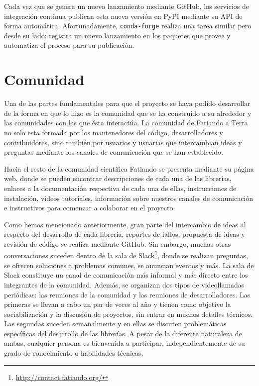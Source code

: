 Cada vez que se genera un nuevo lanzamiento mediante GitHub,
los servicios de integración continua publican esta nueva versión en PyPI
mediante su \ac{API} de forma automática.
Afortunadamente, \texttt{conda-forge} realiza una tarea similar pero desde su
lado: registra un nuevo lanzamiento en los paquetes que provee y automatiza el
proceso para su publicación.


\section{Comunidad}

Una de las partes fundamentales para que el proyecto se haya podido desarrollar
de la forma en que lo hizo es la comunidad que se ha construido a su alrededor
y las comunidades con las que ésta interactúa.
La comunidad de Fatiando a Terra no solo esta formada por los mantenedores del
código, desarrolladores y contribuidores, sino también por usuarios
y usuarias que intercambian ideas y preguntas mediante los canales de
comunicación que se han establecido.

Hacia el resto de la comunidad científica Fatiando se presenta mediante su
página web, donde se pueden encontrar descripciones de cada una de las
librerías, enlaces a la documentación respectiva de cada una de ellas,
instrucciones de instalación, videos tutoriales, información sobre nuestros
canales de comunicación e instructivos para comenzar a colaborar en el
proyecto.

Como hemos mencionado anteriormente, gran parte del intercambio de ideas al
respecto del desarrollo de cada librería, reportes de fallos, propuesta de
ideas y revisión de código se realiza mediante GitHub.
Sin embargo, muchas otras conversaciones suceden dentro de la sala de
Slack\footnote{\url{http://contact.fatiando.org/}}, donde se realizan
preguntas, se ofrecen soluciones a problemas comunes, se anuncian eventos
y más.
La sala de Slack constituye un canal de comunicación más informal y más
directo entre los integrantes de la comunidad.
Además, se organizan dos tipos de videollamadas periódicas: las reuniones de la
comunidad y las reuniones de desarrolladores.
Las primeras se llevan a cabo un par de veces al año y tienen como objetivo la
sociabilización y la discusión de proyectos, sin entrar en muchos detalles
técnicos.
Las segundas suceden semanalmente y en ellas se discuten problemáticas
específicas del desarrollo de las librerías.
A pesar de la diferente naturaleza de ambas, cualquier persona es bienvenida
a participar, independientemente de su grado de conocimiento o habilidades
técnicas.

